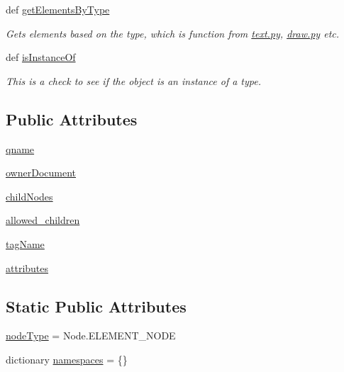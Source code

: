\begin{DoxyCompactItemize}
def \hyperlink{classodf_1_1element_1_1Element_a3228c7117ad9f00bc48a221895bf664a}{get\+Elements\+By\+Type}
\begin{DoxyCompactList}\small\item\em Gets elements based on the type, which is function from \hyperlink{text_8py}{text.\+py}, \hyperlink{draw_8py}{draw.\+py} etc. \end{DoxyCompactList}\item 
def \hyperlink{classodf_1_1element_1_1Element_ae817aee0e4ddb0ff4b5ec2e4413bc754}{is\+Instance\+Of}
\begin{DoxyCompactList}\small\item\em This is a check to see if the object is an instance of a type. \end{DoxyCompactList}\end{DoxyCompactItemize}
\subsection*{Public Attributes}
\begin{DoxyCompactItemize}
\item 
\hyperlink{classodf_1_1element_1_1Element_af094fd4f65c213f17b319c152f8be830}{qname}
\item 
\hyperlink{classodf_1_1element_1_1Element_a3f5adc77e6ef8392e488e913de580b92}{owner\+Document}
\item 
\hyperlink{classodf_1_1element_1_1Element_a7b1caf94c20e484ead54b595dcce9064}{child\+Nodes}
\item 
\hyperlink{classodf_1_1element_1_1Element_a5f26e2e0cc6496fec1adc0f75d60a56c}{allowed\+\_\+children}
\item 
\hyperlink{classodf_1_1element_1_1Element_a95626c50cd66e61210673e949b86198f}{tag\+Name}
\item 
\hyperlink{classodf_1_1element_1_1Element_a075965834885860b3800d7a934d678c5}{attributes}
\end{DoxyCompactItemize}
\subsection*{Static Public Attributes}
\begin{DoxyCompactItemize}
\item 
\hyperlink{classodf_1_1element_1_1Element_a0905e184b9692b74b085ebabe37debb5}{node\+Type} = Node.\+E\+L\+E\+M\+E\+N\+T\+\_\+\+N\+O\+D\+E
\item 
dictionary \hyperlink{classodf_1_1element_1_1Element_a6f97b7e2b9e13ea5e18d1856c10167e6}{namespaces} = \{\}
\end{DoxyCompactItemize}


